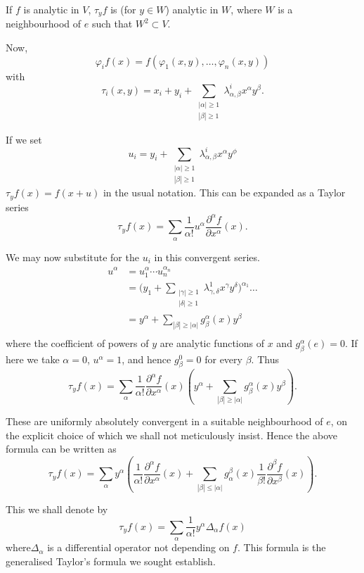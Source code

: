 If $f$ is analytic in $V$, $\tau_y f$ is (for $y \in W$) analytic in
$W$, where $W$ is a neighbourhood of $e$ such that $W^2 \subset V$. 

Now,\pageoriginale 
$$
\varphi_i f(x)  = f(\varphi_1(x,y), \ldots , \varphi_n (x,y))
$$
with 
$$
\tau_i(x,y) = x_i + y_i + \sum _{\substack{| \alpha |
    \ge 1\\ | \beta |  \ge 1}}  \lambda^i_{\alpha, \beta}
x^{\alpha}y^{\beta}.
$$

If we set
$$
u_i = y_i + \sum _{\substack{|\alpha| \ge 1\\ |\beta| \ge 1 }}
\lambda_{\alpha, \beta}^i x^{\alpha}y^{\phi} 
$$
$\tau_y f(x) = f(x+u)$ in the usual notation. This can be expanded as
a Taylor series 
$$
\tau_y f(x) = \sum_{\alpha} \frac{1}{\alpha !} u^{\alpha} 
\frac{\partial^\alpha f}{\partial x^\alpha} (x). 
$$

We may now substitute for the $u_i$ in this convergent series.
\begin{align*}
u^\alpha &= u_1^\alpha \cdots u_n^{\alpha_n}\\
& = \bigg( y_1 + \sum\limits_{\substack{| \gamma |  \ge 1\\ |
    \delta |  \ge 1 }}  \lambda_{\gamma, \delta}^1
x^{\gamma}y^{\delta} \bigg)^{\alpha_1} \ldots\\ 
& = y^{\alpha} + \sum_{| \beta | \geq | \alpha |}
g^{\alpha}_{\beta}(x) y^\beta\\ 
\end{align*}
where the coefficient of powers of $y$ are analytic functions of $x$
and $g^{\alpha}_{\beta}(e)= 0$. If here we take $\alpha = 0$, $u^\alpha
= 1$, and hence $g^{0}_{\beta} = 0$ for every $\beta$. Thus 
$$ 
\tau_y f(x) = \sum_{\alpha}\dfrac{1}{\alpha !} \dfrac{\partial^\alpha
  f}{\partial x^\alpha}(x) (y^\alpha + 
    \sum_{| \beta |\ge | \alpha|}
    g^{\alpha}_{\beta} (x) y^\beta). 
$$

These are uniformly absolutely convergent in a suitable neighbourhood
of $e$, on the explicit choice of which we shall not meticulously
insist. Hence the above formula can be written as 
$$
\tau_y f(x) = \sum_{\alpha} y^\alpha(\dfrac{1}{\alpha !}
\dfrac {\partial^\alpha f} {\partial x^\alpha}(x) + \sum\limits_{|
  \beta | \leq | \alpha |}g^\beta_\alpha (x) \dfrac{1}{\beta
  !} \dfrac{\partial^\beta f}{\partial x^\beta}(x)). 
$$

This we shall denote by
$$
\tau_y f(x) = \sum_{\alpha}\dfrac{1}{\alpha!} y^\alpha
\Delta_\alpha f(x) 
$$
where\pageoriginale $\Delta_\alpha$ is a differential operator not
depending on $f$. This formula is the generalised Taylor's formula we sought
establish. 


